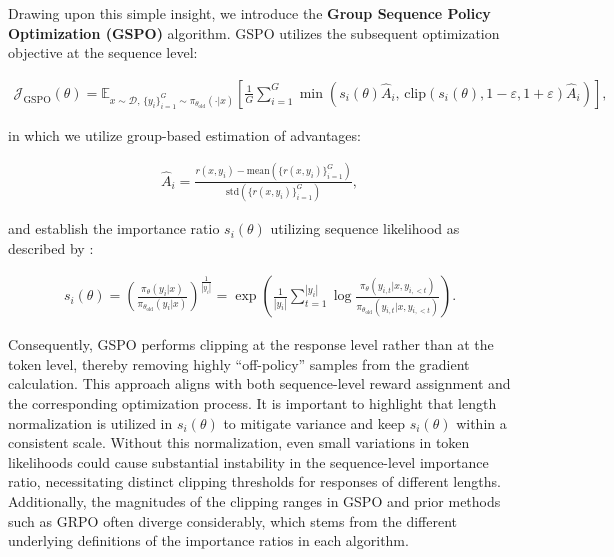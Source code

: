 Drawing upon this simple insight, we introduce the \textbf{Group Sequence Policy Optimization (GSPO)} algorithm. GSPO utilizes the subsequent optimization objective at the sequence level:

\begin{align}
\mathcal{J}_\text{GSPO} (\theta) =
\mathbb{E}_{ x \sim \mathcal{D},\, \{y_i\}_{i=1}^G \sim \pi_{\theta_\text{old}}( \cdot | x) }
\left[ 
\frac{1}{G} \sum_{i=1}^{G}
\min \left( s_{i}(\theta)  \widehat{A}_{i},  \, \mathrm{clip} \left( s_{i}(\theta), 1 - {\varepsilon}, 1 + {\varepsilon} \right) \widehat{A}_{i} \right) 
\right],
\label{equ:gspo}
\end{align}

in which we utilize group-based estimation of advantages:

\begin{align}
\widehat{A}_{i} = \frac{r(x, y_i) - \mathrm{mean} \left( \{ r(x, y_i) \}_{i=1}^G \right) }{ \mathrm{std} \left( \{ r(x, y_i) \}_{i=1}^G \right) },
\end{align}

and establish the importance ratio $s_{i}(\theta)$ utilizing sequence likelihood as described by \citet{click}:

\begin{align}
s_{i}(\theta) = \left( \frac{ \pi_{\theta} (y_i | x) }{ \pi_{\theta_\text{old}} (y_i | x)} \right)^{\frac{1}{|y_i|}}
=
\exp \left( \frac{1}{|y_i|} \sum_{t=1}^{|y_i|} \log \frac{ \pi_{\theta} (y_{i,t} | x, y_{i,<t}) }{ \pi_{\theta_\text{old}} (y_{i,t} | x,y_{i,<t})} \right).
\end{align}

Consequently, GSPO performs clipping at the response level rather than at the token level, thereby removing highly ``off-policy'' samples from the gradient calculation. This approach aligns with both sequence-level reward assignment and the corresponding optimization process. It is important to highlight that length normalization is utilized in $s_{i}(\theta)$ to mitigate variance and keep $s_{i}(\theta)$ within a consistent scale. Without this normalization, even small variations in token likelihoods could cause substantial instability in the sequence-level importance ratio, necessitating distinct clipping thresholds for responses of different lengths. Additionally, the magnitudes of the clipping ranges in GSPO and prior methods such as GRPO often diverge considerably, which stems from the different underlying definitions of the importance ratios in each algorithm.

